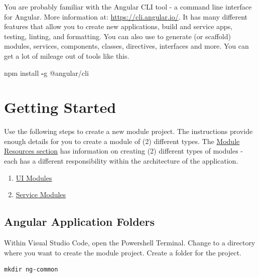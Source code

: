 \documentclass[]{book}
\newenvironment{Shaded}{\begin{snugshade}}{\end{snugshade}}
\newcommand{\OperatorTok}[1]{\textcolor[rgb]{0.81,0.36,0.00}{\textbf{#1}}}
\newcommand{\NormalTok}[1]{#1}
\providecommand{\tightlist}{%
  \setlength{\itemsep}{0pt}\setlength{\parskip}{0pt}}
\theoremstyle{definition}
\theoremstyle{definition}
\theoremstyle{definition}
\theoremstyle{remark}
\begin{document}
You are probably familiar with the Angular CLI tool - a command line
interface for Angular. More information at:
\url{https://cli.angular.io/}. It has many different features that allow
you to create new applications, build and service apps, testing,
linting, and formatting. You can also use to generate (or scaffold)
modules, services, components, classes, directives, interfaces and more.
You can get a lot of mileage out of tools like this.

\begin{Shaded}
\begin{Highlighting}[]
\NormalTok{npm install }\OperatorTok{-}\NormalTok{g @angular/cli}
\end{Highlighting}
\end{Shaded}

\chapter{Getting Started}\label{getting-started}

Use the following steps to create a new module project. The instructions
provide enough details for you to create a module of (2) different
types. The \protect\hyperlink{ui-modules}{Module Resources section} has
information on creating (2) different types of modules - each has a
different responsibility within the architecture of the application.

\begin{enumerate}
\def\labelenumi{\arabic{enumi}.}
\tightlist
\item
  \protect\hyperlink{ui-modules}{UI Modules}
\item
  \protect\hyperlink{service-modules}{Service Modules}
\end{enumerate}

\section{Angular Application Folders}\label{angular-application-folders}

Within Visual Studio Code, open the Powershell Terminal. Change to a
directory where you want to create the module project. Create a folder
for the project.

\begin{verbatim}
mkdir ng-common
\end{verbatim}
\end{document}
